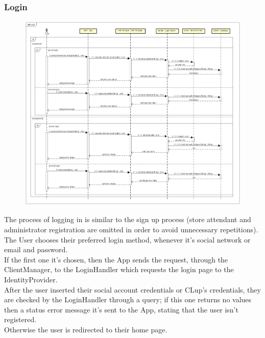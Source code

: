 \documentclass[table, 12pt]{article}
\begin{document}
\subsubsection{Login}
\begin{figure}[H]
    \begin{center}
        \includegraphics[width=\textwidth]{assets/Sequence-Diagram/login.png}
    \end{center}
\end{figure}
The process of logging in is similar to the sign up process (store attendant and administrator  registration are omitted in order to avoid unnecessary repetitions).\\
The User chooses their preferred login method, whenever it's social network or email and password.\\
If the first one it's chosen, then the App sends the request, through the ClientManager, to the LoginHandler which requests the login page to the IdentityProvider.\\
After the user inserted their social account credentials or CLup's credentials, they are checked by the LoginHandler through a query; if this one returns no values then a status error message it's sent to the App, stating that the user isn't registered.\\
Otherwise the user is redirected to their home page.
\end{document}
